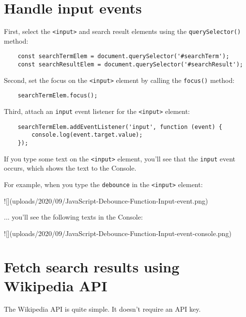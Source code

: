 \documentclass[11pt]{article}
\begin{document}
\section*{Handle input events}

First, select the \verb|<input>| and search result elements using the
\verb|querySelector()| method:

\begin{lstlisting}
    const searchTermElem = document.querySelector('#searchTerm');
    const searchResultElem = document.querySelector('#searchResult');
\end{lstlisting}

\noindent
Second, set the focus on the \verb|<input>| element by calling the
\verb|focus()| method:

\begin{lstlisting}
    searchTermElem.focus();
\end{lstlisting}

\noindent
Third, attach an \verb|input| event listener for the \verb|<input>| element:

\begin{lstlisting}
    searchTermElem.addEventListener('input', function (event) {
        console.log(event.target.value);
    });
\end{lstlisting}

\noindent
If you type some text on the \verb|<input>| element, you'll see that the
\verb|input| event occurs, which shows the text to the Console.
\newline

\noindent
For example, when you type the \verb|debounce| in the \verb|<input>| element:

![](uploads/2020/09/JavaScript-Debounce-Function-Input-event.png)

\noindent
... you'll see the following texts in the Console:

![](uploads/2020/09/JavaScript-Debounce-Function-Input-event-console.png)

\section*{Fetch search results using Wikipedia API}

The Wikipedia API is quite simple. It doesn't require an API key.
\newline
\end{document}
